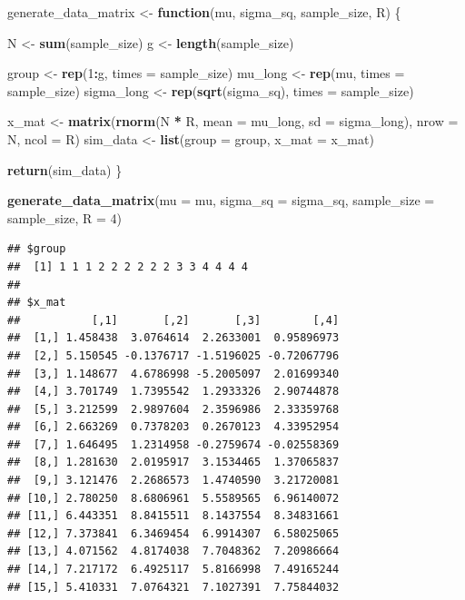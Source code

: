 \documentclass[
]{book}
\newenvironment{Shaded}{\begin{snugshade}}{\end{snugshade}}
\newcommand{\AttributeTok}[1]{\textcolor[rgb]{0.13,0.29,0.53}{#1}}
\newcommand{\ControlFlowTok}[1]{\textcolor[rgb]{0.13,0.29,0.53}{\textbf{#1}}}
\newcommand{\DecValTok}[1]{\textcolor[rgb]{0.00,0.00,0.81}{#1}}
\newcommand{\FunctionTok}[1]{\textcolor[rgb]{0.13,0.29,0.53}{\textbf{#1}}}
\newcommand{\NormalTok}[1]{#1}
\newcommand{\OtherTok}[1]{\textcolor[rgb]{0.56,0.35,0.01}{#1}}
\newcommand{\SpecialCharTok}[1]{\textcolor[rgb]{0.81,0.36,0.00}{\textbf{#1}}}
\begin{document}
\begin{Shaded}
\begin{Highlighting}[]
\NormalTok{generate\_data\_matrix }\OtherTok{\textless{}{-}} \ControlFlowTok{function}\NormalTok{(mu, sigma\_sq, sample\_size, R) \{}

\NormalTok{  N }\OtherTok{\textless{}{-}} \FunctionTok{sum}\NormalTok{(sample\_size) }
\NormalTok{  g }\OtherTok{\textless{}{-}} \FunctionTok{length}\NormalTok{(sample\_size) }
  
\NormalTok{  group }\OtherTok{\textless{}{-}} \FunctionTok{rep}\NormalTok{(}\DecValTok{1}\SpecialCharTok{:}\NormalTok{g, }\AttributeTok{times =}\NormalTok{ sample\_size) }
\NormalTok{  mu\_long }\OtherTok{\textless{}{-}} \FunctionTok{rep}\NormalTok{(mu, }\AttributeTok{times =}\NormalTok{ sample\_size)}
\NormalTok{  sigma\_long }\OtherTok{\textless{}{-}} \FunctionTok{rep}\NormalTok{(}\FunctionTok{sqrt}\NormalTok{(sigma\_sq), }\AttributeTok{times =}\NormalTok{ sample\_size) }

\NormalTok{  x\_mat }\OtherTok{\textless{}{-}} \FunctionTok{matrix}\NormalTok{(}\FunctionTok{rnorm}\NormalTok{(N }\SpecialCharTok{*}\NormalTok{ R, }\AttributeTok{mean =}\NormalTok{ mu\_long, }\AttributeTok{sd =}\NormalTok{ sigma\_long),}
                  \AttributeTok{nrow =}\NormalTok{ N, }\AttributeTok{ncol =}\NormalTok{ R)}
\NormalTok{  sim\_data }\OtherTok{\textless{}{-}} \FunctionTok{list}\NormalTok{(}\AttributeTok{group =}\NormalTok{ group, }\AttributeTok{x\_mat =}\NormalTok{ x\_mat)}
    
  \FunctionTok{return}\NormalTok{(sim\_data)}
\NormalTok{\}}

\FunctionTok{generate\_data\_matrix}\NormalTok{(}\AttributeTok{mu =}\NormalTok{ mu, }\AttributeTok{sigma\_sq =}\NormalTok{ sigma\_sq,}
                     \AttributeTok{sample\_size =}\NormalTok{ sample\_size, }\AttributeTok{R =} \DecValTok{4}\NormalTok{)}
\end{Highlighting}
\end{Shaded}

\begin{verbatim}
## $group
##  [1] 1 1 1 2 2 2 2 2 2 3 3 4 4 4 4
## 
## $x_mat
##           [,1]       [,2]       [,3]        [,4]
##  [1,] 1.458438  3.0764614  2.2633001  0.95896973
##  [2,] 5.150545 -0.1376717 -1.5196025 -0.72067796
##  [3,] 1.148677  4.6786998 -5.2005097  2.01699340
##  [4,] 3.701749  1.7395542  1.2933326  2.90744878
##  [5,] 3.212599  2.9897604  2.3596986  2.33359768
##  [6,] 2.663269  0.7378203  0.2670123  4.33952954
##  [7,] 1.646495  1.2314958 -0.2759674 -0.02558369
##  [8,] 1.281630  2.0195917  3.1534465  1.37065837
##  [9,] 3.121476  2.2686573  1.4740590  3.21720081
## [10,] 2.780250  8.6806961  5.5589565  6.96140072
## [11,] 6.443351  8.8415511  8.1437554  8.34831661
## [12,] 7.373841  6.3469454  6.9914307  6.58025065
## [13,] 4.071562  4.8174038  7.7048362  7.20986664
## [14,] 7.217172  6.4925117  5.8166998  7.49165244
## [15,] 5.410331  7.0764321  7.1027391  7.75844032
\end{verbatim}
\end{document}
